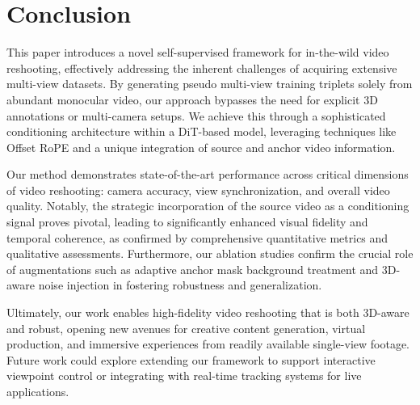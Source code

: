 \section{Conclusion}
\label{sec:conclusion}

This paper introduces a novel self-supervised framework for in-the-wild video reshooting, effectively addressing the inherent challenges of acquiring extensive multi-view datasets. By generating pseudo multi-view training triplets solely from abundant monocular video, our approach bypasses the need for explicit 3D annotations or multi-camera setups. We achieve this through a sophisticated conditioning architecture within a DiT-based model, leveraging techniques like Offset RoPE and a unique integration of source and anchor video information.

Our method demonstrates state-of-the-art performance across critical dimensions of video reshooting: camera accuracy, view synchronization, and overall video quality. Notably, the strategic incorporation of the source video as a conditioning signal proves pivotal, leading to significantly enhanced visual fidelity and temporal coherence, as confirmed by comprehensive quantitative metrics and qualitative assessments. Furthermore, our ablation studies confirm the crucial role of augmentations such as adaptive anchor mask background treatment and 3D-aware noise injection in fostering robustness and generalization.

Ultimately, our work enables high-fidelity video reshooting that is both 3D-aware and robust, opening new avenues for creative content generation, virtual production, and immersive experiences from readily available single-view footage. Future work could explore extending our framework to support interactive viewpoint control or integrating with real-time tracking systems for live applications.